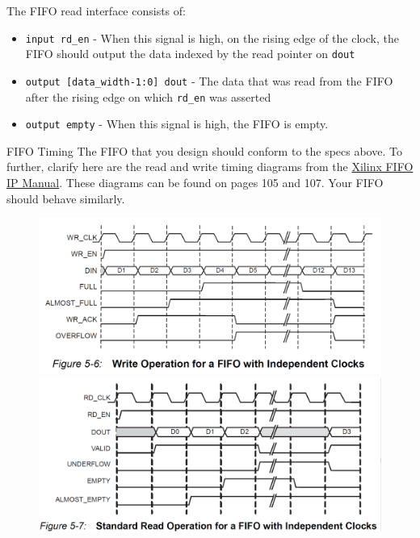 \documentclass[11pt]{article}
\makeatletter
\renewcommand{\subsection}
{\@startsection {subsection}{1}{0pt}
 {-1ex}
 {0.5ex}
 {\bfseries\normalsize}}
\makeatother
\begin{document}
The FIFO read interface consists of:
\begin{itemize}
    \item \verb|input rd_en| - When this signal is high, on the rising edge of the clock, the FIFO should output the data indexed by the read pointer on \verb|dout|
    \item \verb|output [data_width-1:0] dout| - The data that was read from the FIFO after the rising edge on which \verb|rd_en| was asserted
    \item \verb|output empty| - When this signal is high, the FIFO is empty.
\end{itemize}

\subsection{FIFO Timing}
The FIFO that you design should conform to the specs above.
To further, clarify here are the read and write timing diagrams from the \href{https://www.xilinx.com/support/documentation/ip_documentation/fifo_generator_ug175.pdf}{Xilinx FIFO IP Manual}.
These diagrams can be found on pages 105 and 107.
Your FIFO should behave similarly.

\begin{figure}[H]
    \includegraphics[width=\linewidth]{sync_fifo_write_operation.png}
    \endminipage\hfill
    \includegraphics[width=\linewidth]{sync_fifo_read_operation.png}
    \endminipage
\end{figure}
\end{document}
